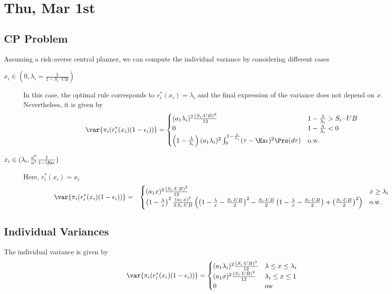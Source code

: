 \section{Thu, Mar 1st}
\subsection{CP Problem}
Assuming a risk-averse central planner, we can compute the individual variance by
considering different cases
\begin{description}
\item[$x_i\in(0,\lambda_i=\frac{\lambda}{1-S_i\cdot UB})$]
In this case, the optimal rule corresponds to $r_i^*(x_i)=\lambda_i$ and the final expression of the variance does not depend on $x$. Nevertheless, it is given by
\[\var\{\pi_i(r^*_i(x_i)(1-\epsilon_i))\}=\displaystyle\begin{cases}
(a_1\lambda_i)^2\frac{(S_i\cdot UB)^2}{12}&1-\frac{\lambda}{\lambda_i}>S_i\cdot UB\\
0&1-\frac{\lambda}{\lambda_i}<0\\
\left(1-\frac{\lambda}{\lambda_i}\right)(a_1\lambda_i)^2\int_0^{1-\frac{\lambda}{\lambda_i}}(\tau-\Ex\epsilon)^2\Pro(d\tau)&{\rm o.w.}
\end{cases}\]

\item[$x_i\in(\lambda_i,\frac{a^0}{a^1}\frac{1}{1-\Ex\epsilon})$] Here, $r_i^*(x_i)=x_i$
\begin{eqnarray*}
\var\{\pi_i(r^*_i(x_i)(1-\epsilon_i))\}&=&\begin{cases}
(a_1 x)^2\frac{(S_i\cdot UB)^2}{12}&x\geq \lambda_i\\
\left(1-\frac{\lambda}{x}\right)^2\frac{(a_1\,x)^2}{3\,S_i\cdot UB}\left(\left(1-\frac{\lambda}{x}-\frac{S_i\cdot UB}{2}\right)^2-\frac{S_i\cdot UB}{2}\left(1-\frac{\lambda}{x}-\frac{S_i\cdot UB}{2}\right)+\left(\frac{S_i\cdot UB}{2}\right)^2\right)&{\rm o.w.}
\end{cases}
\end{eqnarray*}
\end{description}

\subsection{Individual Variances}
The individual variance is given by
\begin{equation}\label{indvar}
\var\{\pi_i(r^*_i(x_i)(1-\epsilon_i))\}=\begin{cases}
(a_1\lambda_i)^2\frac{(S_i\cdot UB)^2}{12}&\lambda\leq x\leq \lambda_i\\
(a_1 x)^2\frac{(S_i\cdot UB)^2}{12}&\lambda_i\leq x\leq 1\\
0& {\rm ow}
\end{cases}
\end{equation}

